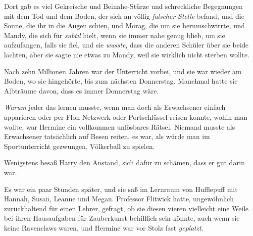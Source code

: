Dort gab es viel Gekreische und Beinahe-Stürze und schreckliche Begegnungen mit dem Tod und dem Boden, der sich an völlig \emph{falscher Stelle} befand, und die Sonne, die ihr in die Augen schien, und Morag, die um sie herumschwirrte, und Mandy, die sich für \emph{subtil} hielt, wenn sie immer nahe genug blieb, um sie aufzufangen, falls sie fiel, und sie \emph{wusste}, dass die anderen Schüler über sie beide lachten, aber sie sagte nie etwas zu Mandy, weil sie wirklich nicht sterben wollte.

Nach zehn Millionen Jahren war der Unterricht vorbei, und sie war wieder am Boden, wo sie hingehörte, bis zum nächsten Donnerstag. Manchmal hatte sie Albträume davon, dass es immer Donnerstag wäre.

\emph{Warum} jeder das lernen musste, wenn man doch als Erwachsener einfach apparieren oder per Floh-Netzwerk oder Portschlüssel reisen konnte, wohin man wollte, war Hermine ein vollkommen unlösbares Rätsel. Niemand musste als Erwachsener tatsächlich auf Besen reiten, es war, als würde man im Sportunterricht gezwungen, Völkerball zu spielen.

Wenigstens besaß Harry den Anstand, sich dafür zu schämen, dass er gut darin war.

\later

Es war ein paar Stunden später, und sie saß im Lernraum von Hufflepuff mit Hannah, Susan, Leanne und Megan. Professor Flitwick hatte, ungewöhnlich zurückhaltend für einen Lehrer, gefragt, ob sie diesen vieren vielleicht eine Weile bei ihren Hausaufgaben für Zauberkunst behilflich sein könnte, auch wenn sie keine Ravenclaws waren, und Hermine war vor Stolz fast \emph{geplatzt}.

